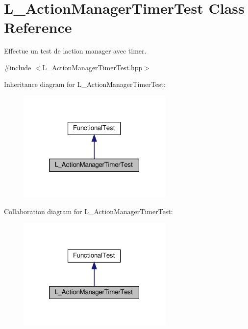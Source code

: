 \hypertarget{classL__ActionManagerTimerTest}{}\section{L\+\_\+\+Action\+Manager\+Timer\+Test Class Reference}
\label{classL__ActionManagerTimerTest}


Effectue un test de l\textquotesingle{}action manager avec timer.  




{\ttfamily \#include $<$L\+\_\+\+Action\+Manager\+Timer\+Test.\+hpp$>$}



Inheritance diagram for L\+\_\+\+Action\+Manager\+Timer\+Test\+:
\nopagebreak
\begin{figure}[H]
\begin{center}
\leavevmode
\includegraphics[width=217pt]{classL__ActionManagerTimerTest__inherit__graph}
\end{center}
\end{figure}


Collaboration diagram for L\+\_\+\+Action\+Manager\+Timer\+Test\+:
\nopagebreak
\begin{figure}[H]
\begin{center}
\leavevmode
\includegraphics[width=217pt]{classL__ActionManagerTimerTest__coll__graph}
\end{center}
\end{figure}

